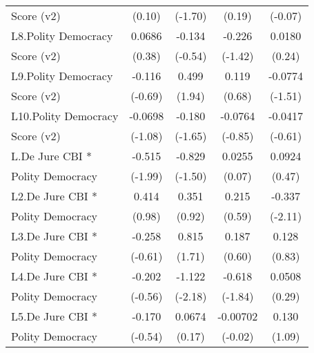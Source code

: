 {\begin{tabular}{l*{4}{c}}
Score (v2)          &      (0.10)         &     (-1.70)         &      (0.19)         &     (-0.07)         \\
[1em]
L8.Polity Democracy &      0.0686         &      -0.134         &      -0.226         &      0.0180         \\
Score (v2)          &      (0.38)         &     (-0.54)         &     (-1.42)         &      (0.24)         \\
[1em]
L9.Polity Democracy &      -0.116         &       0.499         &       0.119         &     -0.0774         \\
Score (v2)          &     (-0.69)         &      (1.94)         &      (0.68)         &     (-1.51)         \\
[1em]
L10.Polity Democracy&     -0.0698         &      -0.180         &     -0.0764         &     -0.0417         \\
Score (v2)          &     (-1.08)         &     (-1.65)         &     (-0.85)         &     (-0.61)         \\
[1em]
L.De Jure CBI *     &      -0.515\sym{*}  &      -0.829         &      0.0255         &      0.0924         \\
Polity Democracy    &     (-1.99)         &     (-1.50)         &      (0.07)         &      (0.47)         \\
[1em]
L2.De Jure CBI *    &       0.414         &       0.351         &       0.215         &      -0.337\sym{*}  \\
Polity Democracy    &      (0.98)         &      (0.92)         &      (0.59)         &     (-2.11)         \\
[1em]
L3.De Jure CBI *    &      -0.258         &       0.815         &       0.187         &       0.128         \\
Polity Democracy    &     (-0.61)         &      (1.71)         &      (0.60)         &      (0.83)         \\
[1em]
L4.De Jure CBI *    &      -0.202         &      -1.122\sym{*}  &      -0.618         &      0.0508         \\
Polity Democracy    &     (-0.56)         &     (-2.18)         &     (-1.84)         &      (0.29)         \\
[1em]
L5.De Jure CBI *    &      -0.170         &      0.0674         &    -0.00702         &       0.130         \\
Polity Democracy    &     (-0.54)         &      (0.17)         &     (-0.02)         &      (1.09)         \\

\end{tabular}}
